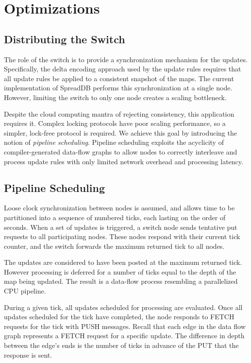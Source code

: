 \documentclass{sig-alternate}
\begin{document}
\section{Optimizations}
\label{sec:optimizations}

\subsection{Distributing the Switch}
\label{sec:distswitch}
The role of the switch is to provide a synchronization mechanism for the updates.  Specifically, the delta encoding approach used by the update rules requires that all update rules be applied to a consistent snapshot of the maps.  The current implementation of SpreadDB performs this synchronization at a single node.  However, limiting the switch to only one node creates a scaling bottleneck.  

Despite the cloud computing mantra of rejecting consistency, this application requires it.  Complex locking protocols have poor scaling performance, so a simpler, lock-free protocol is required.  We achieve this goal by introducing the notion of \textit{pipeline scheduling}.  Pipeline scheduling exploits the acyclicity of compiler-generated data-flow graphs to allow nodes to correctly interleave and process update rules with only limited network overhead and processing latency.

\subsection{Pipeline Scheduling}
Loose clock synchronization between nodes is assumed, and allows time to be partitioned into a sequence of numbered ticks, each lasting on the order of seconds.  When a set of updates is triggered, a switch node sends tentative put requests to all participating nodes.  These nodes respond with their current tick counter, and the switch forwards the maximum returned tick to all nodes.

The updates are considered to have been posted at the maximum returned tick.  However processing is deferred for a number of ticks equal to the depth of the map being updated.  The result is a data-flow process resembling a parallelized CPU pipeline.

During a given tick, all updates scheduled for processing are evaluated.  Once all updates scheduled for the tick have completed, the node responds to FETCH requests for the tick with PUSH messages.  Recall that each edge in the data flow graph represents a FETCH request for a specific update.  The difference in depth between the edge's ends is the number of ticks in advance of the PUT that the response is sent.  
\end{document}
